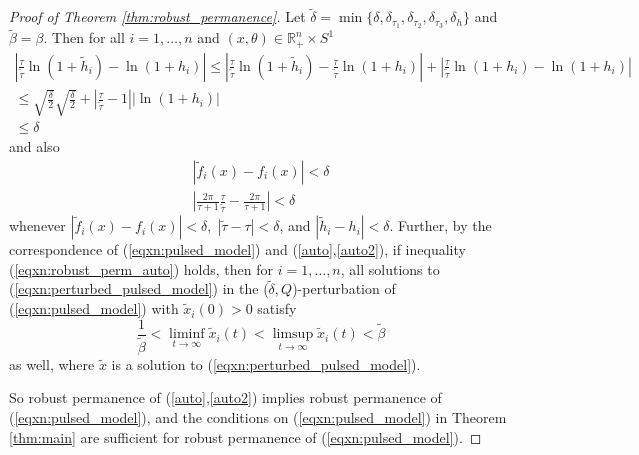 \documentclass{article}
\theoremstyle{definition}
\newcommand{\R}{{\mathbb{R}}}
\begin{document}
\begin{proof}[Proof of Theorem \ref{thm:robust_permanence}]
    Let $\tilde{\delta} = \min{\{\delta, \delta_{\tau_1}, \delta_{\tau_2}, \delta_{\tau_3}, \delta_h}\}$ and $\tilde \beta = \beta$. Then for all $i = 1, \ldots, n$ and $(x, \theta) \in \R^n_+ \times S^1$
    \begin{equation*}
        \begin{split}
            |\frac{\tau}{\tilde{\tau}}\ln{(1+\tilde{h}_i)-\ln{(1+h_i)}}| \leq |\frac{\tau}{\tilde{\tau}}\ln{(1+\tilde{h}_i)} - \frac{\tau}{\tilde{\tau}}\ln{(1+h_i)}| + |\frac{\tau}{\tilde{\tau}}\ln{(1+h_i)} - \ln{(1+h_i)}|\\
            \leq \sqrt{\frac{\delta}{2}}\sqrt{\frac{\delta}{2}} + |\frac{\tau}{\tilde{\tau}} - 1||\ln(1+h_i)| \\
            \leq \delta
        \end{split}
    \end{equation*}
    and also
     \begin{equation*}
        \begin{split}
            |\tilde{f}_i(x) - f_i(x)| < \delta \\
            |\frac{2\pi}{\tau + 1}\frac{\tau}{\tilde{\tau}} - \frac{2\pi}{\tau + 1}| < \delta
        \end{split}
    \end{equation*}
    whenever $|\tilde{f}_i(x)-f_i(x)| < \delta, \; |\tilde{\tau}-\tau| < \delta$, and $|\tilde{h}_i - h_i| < \delta$. Further, by the correspondence of (\ref{eqxn:pulsed_model}) and (\ref{auto},\ref{auto2}), if inequality (\ref{eqxn:robust_perm_auto}) holds, then for $i = 1, \ldots, n$, all solutions to (\ref{eqxn:perturbed_pulsed_model}) in the ($\tilde{ \delta}, Q$)-perturbation of (\ref{eqxn:pulsed_model}) with $\tilde{x}_i(0) > 0$ satisfy
    $$
        \frac{1}{\tilde \beta} < \liminf_{t \to \infty} \tilde{x}_i(t) < \limsup_{t \to \infty} \tilde{x}_i(t) < \tilde \beta
    $$ as well, where $\tilde{x}$ is a solution to (\ref{eqxn:perturbed_pulsed_model}).

    So robust permanence of  (\ref{auto},\ref{auto2}) implies robust permanence of (\ref{eqxn:pulsed_model}), and the conditions on (\ref{eqxn:pulsed_model}) in Theorem \ref{thm:main} are sufficient for robust permanence of (\ref{eqxn:pulsed_model}).
    
\end{proof}



\end{document}
